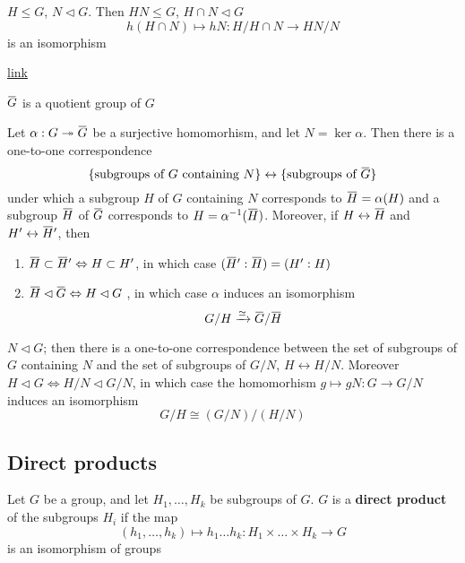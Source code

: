 \documentclass[11pt]{article}
\begin{document}
\begin{theorem}
\(H\le G\), \(N\lhd G\). Then \(HN\le G\), \(H\cap N\lhd G\)
\begin{equation*}
h(H\cap N)\mapsto hN:H/H\cap N\to HN/ N
\end{equation*}
is an isomorphism
\end{theorem}

\href{https://math.stackexchange.com/questions/3122468/is-hn-n-equal-to-h-n}{link}

\(\barG\) is a quotient group of \(G\)
\begin{theorem}
\label{1.47}
Let \(\alpha:G\twoheadrightarrow\barG\) be a surjective homomorhism, and let \(N=\ker\alpha\). Then there is a one-to-one
correspondence
\begin{equation*}
\{\text{subgroups of $G$ containing $N$}\}\leftrightarrow\{\text{subgroups of $\barG$}\}
\end{equation*}
under which a subgroup \(H\) of \(G\) containing \(N\) corresponds to \(\barH=\alpha(H)\) and a
subgroup \(\barH\) of \(\barG\) corresponds to \(H=\alpha^{-1}(\barH)\). Moreover, if \(H\leftrightarrow\barH\)
and \(H'\leftrightarrow\barH'\), then
\begin{enumerate}
\item \(\barH\subset\barH'\Leftrightarrow H\subset H'\), in which case \((\barH':\barH)=(H':H)\)
\item \(\barH\lhd\barG\Leftrightarrow H\lhd G\) , in which case \(\alpha\) induces an isomorphism
\begin{equation*}
G/H\xrightarrow{\simeq}\barG/\barH
\end{equation*}
\end{enumerate}
\end{theorem}

\begin{corollary}[]
\(N\lhd G\); then there is a one-to-one correspondence between the set of subgroups of \(G\)
containing \(N\) and the set of subgroups of \(G/N\), \(H\leftrightarrow H/N\).
Moreover \(H\lhd G\Leftrightarrow H/N\lhd G/N\), in which case the homomorhism \(g\mapsto gN:G\to G/N\) induces an
isomorphism
\begin{equation*}
G/H\cong(G/N)/(H/N)
\end{equation*}
\end{corollary}
\subsection{Direct products}
\label{sec:orgba3db81}
Let \(G\) be a group, and let \(H_1,\dots,H_k\) be subgroups of \(G\). \(G\) is a \textbf{direct product} of
the subgroups \(H_i\) if the map
\begin{equation*}
(h_1,\dots,h_k)\mapsto h_1\dots h_k:H_1\times\dots\times H_k\to G
\end{equation*}
is an isomorphism of groups
\end{document}
